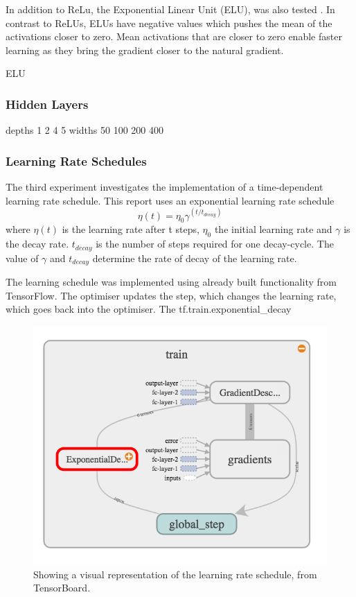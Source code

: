 \documentclass[]{article}
\begin{document}
In addition to ReLu, the Exponential Linear Unit (ELU), was also tested \cite{elu}. In contrast to ReLUs, ELUs have negative values which pushes the mean of the activations closer to zero. Mean activations that are closer to zero enable faster learning as they bring the gradient closer to the natural gradient.

ELU

\subsubsection{Hidden Layers}

depths 1 2 4 5
widths 50 100 200 400


\subsubsection{Learning Rate Schedules}

The third experiment investigates the implementation of a time-dependent learning rate schedule. This report uses an exponential learning rate schedule  
\begin{equation} \label{eq:1}
\eta(t) = \eta_{0} \gamma ^{(t / t_{decay})}
\end{equation}
where \(\eta(t)\) is the learning rate after t steps, \(\eta_{0}\) the initial learning rate and \(\gamma\) is the decay rate. \(t_{decay}\) is the number of steps required for one decay-cycle. The value of \(\gamma\) and \(t_{decay}\) determine the rate of decay of the learning rate. 

The learning schedule was implemented using already built functionality from TensorFlow. The optimiser updates the step, which changes the learning rate, which goes back into the optimiser.  The tf.train.exponential\_decay

\begin{figure}[h]
	\includegraphics[width=\textwidth]{model_2}
	\caption{Showing a visual representation of the learning rate schedule, from TensorBoard.}
	\label{model_2}
	\centering
\end{figure}
\end{document}
